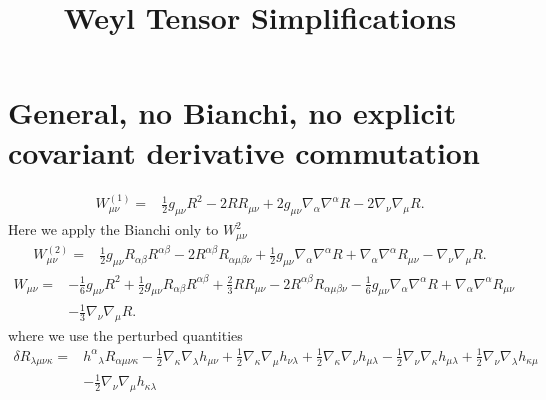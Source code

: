 \documentclass[10pt,letterpaper]{article}
\title{Weyl Tensor Simplifications}
\date{}
\begin{document}
\maketitle
\noindent

\section*{General, no Bianchi, no explicit covariant derivative commutation}
\begin{align}
W^{(1)}_{\mu\nu}={}&\tfrac{1}{2} g_{\mu \nu} R^2
 - 2 R R_{\mu \nu}
 + 2 g_{\mu \nu} \nabla_{\alpha}\nabla^{\alpha}R
 - 2 \nabla_{\nu}\nabla_{\mu}R.
\end{align}
Here we apply the Bianchi only to $W^2_{\mu\nu}$
\begin{align}
W^{(2)}_{\mu\nu}={}&\tfrac{1}{2} g_{\mu \nu} R_{\alpha \beta} R^{\alpha \beta}
 - 2 R^{\alpha \beta} R_{\alpha \mu \beta \nu}
 + \tfrac{1}{2} g_{\mu \nu} \nabla_{\alpha}\nabla^{\alpha}R
 + \nabla_{\alpha}\nabla^{\alpha}R_{\mu \nu}
 -  \nabla_{\nu}\nabla_{\mu}R.
\end{align}
\begin{align}
W_{\mu\nu}={}&- \tfrac{1}{6} g_{\mu \nu} R^2
 + \tfrac{1}{2} g_{\mu \nu} R_{\alpha \beta} R^{\alpha \beta}
 + \tfrac{2}{3} R R_{\mu \nu}
 - 2 R^{\alpha \beta} R_{\alpha \mu \beta \nu}
 -  \tfrac{1}{6} g_{\mu \nu} \nabla_{\alpha}\nabla^{\alpha}R
 + \nabla_{\alpha}\nabla^{\alpha}R_{\mu \nu}\nonumber\\
& -  \tfrac{1}{3} \nabla_{\nu}\nabla_{\mu}R.
\end{align}
where we use the perturbed quantities
\begin{align}
\delta R_{\lambda\mu\nu\kappa}={}&h^{\alpha}{}_{\lambda} R_{\alpha \mu \nu \kappa}
 -  \tfrac{1}{2} \nabla_{\kappa}\nabla_{\lambda}h_{\mu \nu}
 + \tfrac{1}{2} \nabla_{\kappa}\nabla_{\mu}h_{\nu \lambda}
 + \tfrac{1}{2} \nabla_{\kappa}\nabla_{\nu}h_{\mu \lambda}
 -  \tfrac{1}{2} \nabla_{\nu}\nabla_{\kappa}h_{\mu \lambda}
 + \tfrac{1}{2} \nabla_{\nu}\nabla_{\lambda}h_{\kappa \mu}\nonumber\\
& -  \tfrac{1}{2} \nabla_{\nu}\nabla_{\mu}h_{\kappa \lambda}
\end{align}
\end{document}
